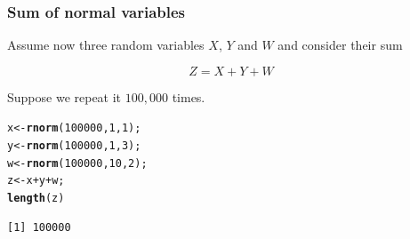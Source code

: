 \documentclass{beamer}\usepackage[]{graphicx}\usepackage[]{color}
\makeatletter
\newcommand{\hlnum}[1]{\textcolor[rgb]{0.2,0.2,0.2}{#1}}%
\newcommand{\hlopt}[1]{\textcolor[rgb]{0.102,0.102,0.102}{#1}}%
\newcommand{\hlstd}[1]{\textcolor[rgb]{0.102,0.102,0.102}{#1}}%
\newcommand{\hlkwb}[1]{\textcolor[rgb]{0.102,0.102,0.102}{#1}}%
\newcommand{\hlkwd}[1]{\textcolor[rgb]{0.102,0.102,0.102}{\textbf{#1}}}%
\newenvironment{kframe}{%
 \def\at@end@of@kframe{}%
 \ifinner\ifhmode%
  \def\at@end@of@kframe{\end{minipage}}%
  \begin{minipage}{\columnwidth}%
 \fi\fi%
 \def\FrameCommand##1{\hskip\@totalleftmargin \hskip-\fboxsep
 \colorbox{shadecolor}{##1}\hskip-\fboxsep
     \hskip-\linewidth \hskip-\@totalleftmargin \hskip\columnwidth}%
 \MakeFramed {\advance\hsize-\width
   \@totalleftmargin\z@ \linewidth\hsize
   \@setminipage}}%
 {\par\unskip\endMakeFramed%
 \at@end@of@kframe}
\newenvironment{knitrout}{}{} %
\renewenvironment{knitrout}{\begin{spacing}{0.75}\begin{tiny}}{\end{tiny}\end{spacing}}
\makeatother
\begin{document}
\begin{frame}[fragile]
\frametitle{Sum of normal variables}

Assume now three random variables $X$, $Y$ and $W$ and consider their sum 

$$  Z = X+Y+W $$ \pause  \newline

Suppose we repeat it $100,000$ times. \pause

\begin{knitrout}\small
{}\color{fgcolor}\begin{kframe}
\begin{alltt}
\hlstd{x} \hlkwb{<-} \hlkwd{rnorm}\hlstd{(}\hlnum{100000}\hlstd{,} \hlnum{1}\hlstd{,} \hlnum{1}\hlstd{);}
\hlstd{y} \hlkwb{<-} \hlkwd{rnorm}\hlstd{(}\hlnum{100000}\hlstd{,} \hlnum{1}\hlstd{,} \hlnum{3}\hlstd{);}
\hlstd{w} \hlkwb{<-} \hlkwd{rnorm}\hlstd{(}\hlnum{100000}\hlstd{,} \hlnum{10}\hlstd{,} \hlnum{2}\hlstd{);}
\hlstd{z} \hlkwb{<-} \hlstd{x}\hlopt{+}\hlstd{y}\hlopt{+}\hlstd{w;}
\hlkwd{length}\hlstd{(z)}
\end{alltt}
\begin{verbatim}
[1] 100000
\end{verbatim}
\end{kframe}
\end{knitrout}

\end{frame}
\end{document}
